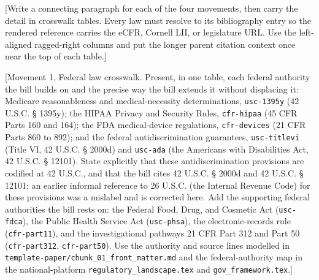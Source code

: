
[Write a connecting paragraph for each of the four movements, then carry the
detail in crosswalk tables. Every law must resolve to its bibliography entry so
the rendered reference carries the eCFR, Cornell LII, or legislature URL. Use the
left-aligned ragged-right columns and put the longer parent citation context once
near the top of each table.]

[Movement 1, Federal law crosswalk. Present, in one table, each federal authority
the bill builds on and the precise way the bill extends it without displacing it:
Medicare reasonableness and medical-necessity determinations,
\texttt{usc-1395y} (42 U.S.C. § 1395y); the HIPAA Privacy and Security Rules,
\texttt{cfr-hipaa} (45 CFR Parts 160 and 164); the FDA medical-device
regulations, \texttt{cfr-devices} (21 CFR Parts 860 to 892); and the federal
antidiscrimination guarantees, \texttt{usc-titlevi} (Title VI, 42 U.S.C. § 2000d)
and \texttt{usc-ada} (the Americans with Disabilities Act, 42 U.S.C. § 12101).
State explicitly that these antidiscrimination provisions are codified at 42
U.S.C., and that the bill cites 42 U.S.C. § 2000d and 42 U.S.C. § 12101; an
earlier informal reference to 26 U.S.C. (the Internal Revenue Code) for these
provisions was a mislabel and is corrected here. Add the supporting federal
authorities the bill rests on: the Federal Food, Drug, and Cosmetic Act
(\texttt{usc-fdca}), the Public Health Service Act (\texttt{usc-phsa}), the
electronic-records rule (\texttt{cfr-part11}), and the investigational pathways
21 CFR Part 312 and Part 50 (\texttt{cfr-part312}, \texttt{cfr-part50}). Use the
authority and source lines modelled in
\texttt{template-paper/chunk\_01\_front\_matter.md} and the federal-authority map
in the national-platform \texttt{regulatory\_landscape.tex} and
\texttt{gov\_framework.tex}.]


